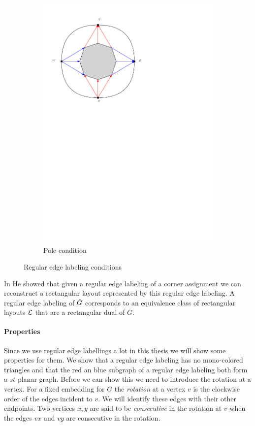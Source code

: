 \begin{figure}
\begin{subfigure}[b]{0.7 \textwidth}
          \includegraphics[width =\textwidth]{rectangularDuals/img/exteriorCondition.pdf}
          \caption{Pole condition}
      \end{subfigure}
      \caption{Regular edge labeling conditions}
  \label{fig:rel:conditions}
  \end{figure}

  In \cite{He1993} He showed that given a regular edge labeling of a corner assignment we can reconstruct a rectangular layout represented by this regular edge labeling.
  A regular edge labeling  of $\bar{G}$ corresponds to an equivalence class of rectangular layouts $\mathcal{L}$ that are a rectangular dual of $G$.

  \paragraph{Properties}
  Since we use regular edge labellings a lot in this thesis we will show some properties for them. We show that a regular edge labeling has no mono-colored triangles and that the red an blue subgraph of a regular edge labeling both form a $st$-planar graph. Before we can show this we need to introduce the rotation at a vertex.
  For a fixed embedding for $G$ the \emph{rotation} at a vertex $v$ is the clockwise order of the edges incident to $v$. We will identify these edges with their other endpoints.
  Two vertices $x, y$ are said to be \emph{consecutive} in the rotation at $v$ when the edges $vx$ and $vy$ are consecutive in the rotation.

